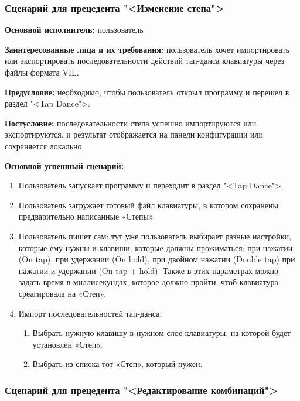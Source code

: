 \subsubsection{Сценарий для прецедента "<Изменение степа">}

\textbf{Основной исполнитель:} пользователь

\textbf{Заинтересованные лица и их требования:} пользователь хочет импортировать или экспортировать последовательности действий тап-данса клавиатуры через файлы формата VIL.

\textbf{Предусловие:} необходимо, чтобы пользователь открыл программу и перешел в раздел "<Tap Dance">.

\textbf{Постусловие:} последовательности степа успешно импортируются или экспортируются, и результат отображается на панели конфигурации или сохраняется локально.

\textbf{Основной успешный сценарий:}

\begin{enumerate}
\item Пользователь запускает программу и переходит в раздел "<Tap Dance">.
\item[2.1. ] Пользователь загружает готовый файл клавиатуры, в котором сохранены предварительно написанные «Степы».
\item[2.2. ] Пользователь пишет сам: тут уже пользователь выбирает разные настройки, которые ему нужны и клавиши, которые должны прожиматься: при нажатии (On tap), при удержании (On hold), при двойном нажатии (Double tap) при нажатии и удержании (On tap + hold). Также в этих параметрах можно задать время в миллисекундах, которое должно пройти, чтоб клавиатура среагировала на «Степ». 
\item[3. ] Импорт последовательностей тап-данса:

\begin{enumerate}
	\item[3.1. ] Выбрать нужную клавишу в нужном слое клавиатуры, на которой будет установлен «Степ».
	\item[3.2. ] Выбрать из списка тот «Степ», который нужен.
\end{enumerate}

\end{enumerate}

\subsubsection{Сценарий для прецедента "<Редактирование комбинаций">}

